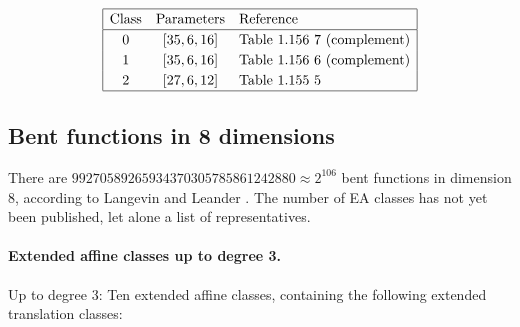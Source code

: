 \documentclass[12pt,a4paper]{article}
\begin{document}
\begin{align*}
\def\arraystretch{1.2}
\begin{array}{|ccl|}
\hline
\text{Class} &
\text{Parameters} & \text{Reference}
\\
\hline
0 & [35,6,16] & \text{Table 1.156 7 (complement)}
\\
1 & [35,6,16] & \text{Table 1.156 6 (complement)}
\\
2 & [27,6,12] & \text{Table 1.155 5 }
\\
\hline
\end{array}
\end{align*}


\subsection{Bent functions in 8 dimensions}

There are
$99 270 589 265 934 370 305 785 861 242 880 \approx 2^{106}$ bent functions in dimension 8,
according to Langevin and Leander \cite{LanL11counting}.
%
%
The number of EA classes has not yet been published, let alone a list of representatives.

\paragraph*{Extended affine classes up to degree 3.}

Up to degree 3:
Ten extended affine classes, containing the following extended translation classes:
\end{document}
